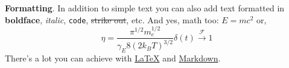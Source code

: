 \textbf{Formatting}. In addition to simple text you can also add text formatted in \textbf{boldface}, \textit{italic}, \verb|code|, \sout{strike out}, etc. And yes, math too: $E  =  mc^{2}$ or,
\begin{equation}
\eta = \frac{\pi^{1/2}m_e^{1/2}}{\gamma_E 8 (2k_BT)^{3/2}} \delta(t) \xrightarrow{\mathscr{F}} 1
\end{equation}
There's a lot you can achieve with \href{https://www.authorea.com/users/3/articles/6868/_show_article}{LaTeX} and \href{https://help.github.com/articles/github-flavored-markdown/}{Markdown}. 